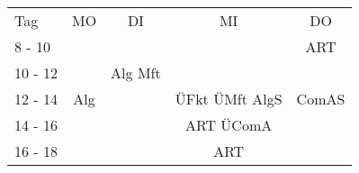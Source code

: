 \documentclass[a4paper,45pt]{scrartcl}
\begin{document}
	\begin{tabularx}{0.9\textwidth}{|X| *{4}{c|}}
		Tag & MO & DI & MI & DO\\
		8 - 10 & & & & ART \\
		10 - 12 & & Alg Mft &  & \\
		12 - 14 & Alg & & ÜFkt ÜMft AlgS& ComAS \\
		14 - 16 & & & ART ÜComA& \\
		16 - 18 & & & ART & \\
	\end{tabularx}
\end{document}
